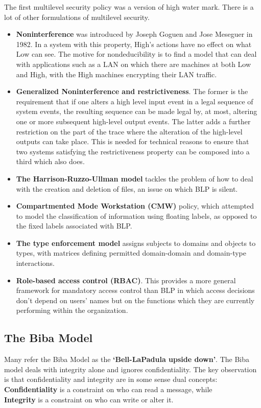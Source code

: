 				The first multilevel security policy was a version of high water mark.
				There is a lot of other formulations of multilevel security.

				\begin{itemize}
					\item {\bf Noninterference} was introduced by Joseph Goguen and Jose Meseguer 
					in 1982. In a system with this property, High’s actions have no effect on
					what Low can see. The motive for nondeducibility is to find a model that can deal with applications such as a LAN on which there are machines at both Low 
					and High, with the High machines encrypting their LAN traffic.
					\item {\bf Generalized Noninterference and restrictiveness}. The
					former is the requirement that if one alters a high level input event in a 
					legal sequence of system events, the resulting sequence can be made legal by, 
					at most, altering one or more subsequent high-level output events. The latter
					adds a further restriction on the part of the trace where the alteration of 
					the high-level outputs can take place. This is needed for technical reasons 
					to ensure that two systems satisfying the restrictiveness property can be composed into a third which also does. 
					\item {\bf The Harrison-Ruzzo-Ullman model} tackles the problem of how to 
					deal with the creation and deletion of files, an issue on which BLP is silent. 
					\item {\bf Compartmented Mode Workstation (CMW)} policy,
					which attempted to model the classification of information using floating
					labels, as opposed to the fixed labels associated with BLP.
					\item {\bf The type enforcement model} assigns subjects to domains and 
					objects to types, with matrices defining permitted domain-domain and 
					domain-type interactions.
					\item {\bf Role-based access control (RBAC)}. This provides a more general
					framework for mandatory access control than BLP in which access decisions 
					don’t depend on users’ names but on the functions which they are currently
					performing within the organization. 
				\end{itemize}

			\clearpage
			\subsection{The Biba Model}
				Many refer the Biba Model as the {\bf ‘Bell-LaPadula upside down’}. 
				The Biba model deals with integrity alone and ignores confidentiality. 
				The key observation is that confidentiality and integrity are in some sense 
				dual concepts:\\
				{\bf Confidentiality} is a constraint on who can read a message, while \\
				{\bf Integrity} is a constraint on who can write or alter it.

